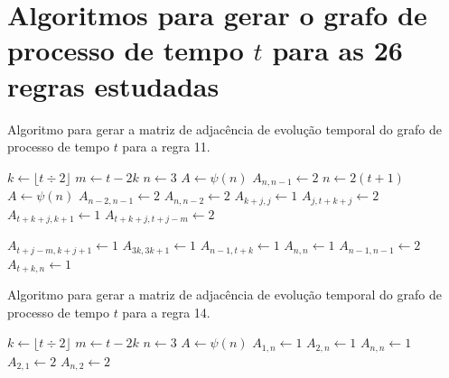 \documentclass[12pt,a4paper]{article}
\begin{document}
\def\refname{Referências bibliográficas}



\appendix
\section{Algoritmos para gerar o grafo de processo de tempo $t$ para as 26 regras
estudadas}

\begin{algorithm}[H]
\caption{Algoritmo para gerar a matriz de adjacência de evolução temporal do
grafo de processo de tempo $t$ para a regra 11.}
\label{alg:r11}
\begin{algorithmic}
\STATE $k \leftarrow \lfloor t \div 2 \rfloor$
\STATE $m \leftarrow t-2k$
    \STATE $n \leftarrow 3$
    \STATE $A \leftarrow \psi(n)$
    \STATE $A_{n,n-1} \leftarrow 2$
\ELSE
    \STATE $n \leftarrow 2(t+1)$
    \STATE $A \leftarrow \psi(n)$
    \STATE $A_{n-2,n-1} \leftarrow 2$
    \STATE $A_{n,n-2} \leftarrow 2$
        \STATE $A_{k+j,j} \leftarrow 1$
        \STATE $A_{j,t+k+j} \leftarrow 2$
    \ENDFOR
        \STATE $A_{t+k+j,k+1} \leftarrow 1$
    \ENDFOR
            \STATE $A_{t+k+j,t+j-m} \leftarrow 2$
        \ENDFOR
    \ENDIF
{}
\end{algorithmic}
\end{algorithm}

\begin{algorithm}[H]
\begin{algorithmic}
            \STATE $A_{t+j-m,k+j+1} \leftarrow 1$
        \ENDFOR
    \ENDIF
        \STATE $A_{3k,3k+1} \leftarrow 1$
    \ENDIF
\ENDIF
\STATE $A_{n-1,t+k} \leftarrow 1$
\STATE $A_{n,n} \leftarrow 1$
\STATE $A_{n-1,n-1} \leftarrow 2$
\STATE $A_{t+k,n} \leftarrow 1$
\end{algorithmic}
\end{algorithm}

\begin{algorithm}[H]
\caption{Algoritmo para gerar a matriz de adjacência de evolução temporal do
grafo de processo de tempo $t$ para a regra 14.}
\label{alg:r14}
\begin{algorithmic}
\STATE $k \leftarrow \lfloor t \div 2 \rfloor$
\STATE $m \leftarrow t-2k$
    \STATE $n \leftarrow 3$
    \STATE $A \leftarrow \psi(n)$
    \STATE $A_{1,n} \leftarrow 1$
    \STATE $A_{2,n} \leftarrow 1$
    \STATE $A_{n,n} \leftarrow 1$
    \STATE $A_{2,1} \leftarrow 2$
    \STATE $A_{n,2} \leftarrow 2$
\ELSE
{}
\end{algorithmic}
\end{algorithm}
\end{document}
